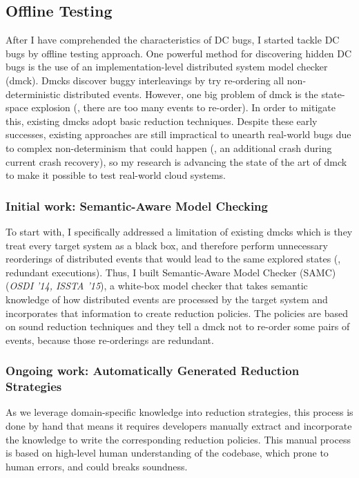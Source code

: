 \documentclass[11pt]{article}
\begin{document}
\subsection{Offline Testing}

After I have comprehended the characteristics of DC bugs, I started tackle DC
bugs by offline testing approach. One powerful method for discovering hidden DC
bugs is the use of an implementation-level distributed system model checker
(dmck). Dmcks discover buggy interleavings by try re-ordering all
non-deterministic distributed events. However, one big problem of dmck is the
state-space explosion (\ie, there are too many events to re-order). In order to
mitigate this, existing dmcks adopt basic reduction techniques. Despite these
early successes, existing approaches are still impractical to unearth real-world
bugs due to complex non-determinism that could happen (\eg, an additional crash
during current crash recovery), so my research is advancing the state of the art
of dmck to make it possible to test real-world cloud systems.

\subsubsection*{Initial work: Semantic-Aware Model Checking} 

To start with, I specifically addressed a limitation of existing dmcks which is
they treat every target system as a black box, and therefore perform unnecessary
reorderings of distributed events that would lead to the same explored states
(\ie, redundant executions). Thus, I built Semantic-Aware Model Checker (SAMC)
(\textit{OSDI '14, ISSTA '15}), a white-box model checker that takes semantic
knowledge of how distributed events are processed by the target system and
incorporates that information to create reduction policies. The policies are
based on sound reduction techniques and they tell a dmck not to re-order some
pairs of events, because those re-orderings are redundant.

\subsubsection*{Ongoing work: Automatically Generated Reduction Strategies} 

As we leverage domain-specific knowledge into reduction strategies, this process
is done by hand that means it requires developers manually extract and
incorporate the knowledge to write the corresponding reduction policies. This
manual process is based on high-level human understanding of the codebase, which
prone to human errors, and could breaks soundness.
\end{document}
